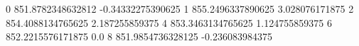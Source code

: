 0 851.8782348632812 -0.34332275390625
1 855.2496337890625 3.028076171875
2 854.4088134765625 2.187255859375
4 853.3463134765625 1.124755859375
6 852.2215576171875 0.0
8 851.9854736328125 -0.236083984375
